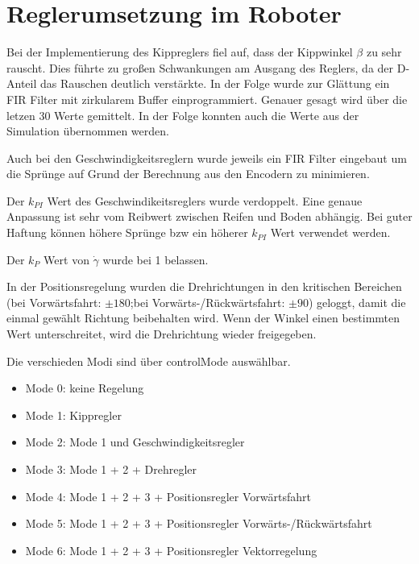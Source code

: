 \renewcommand{\autoren}{Timo Veit}
\newpage
\section{Reglerumsetzung im Roboter}
Bei der Implementierung des Kippreglers fiel auf, dass der Kippwinkel $\beta$ zu sehr rauscht. Dies führte zu großen Schwankungen am Ausgang des Reglers, da der D-Anteil das Rauschen deutlich verstärkte. In der Folge wurde zur Glättung ein FIR Filter mit zirkularem Buffer einprogrammiert. Genauer gesagt wird über die letzen 30 Werte gemittelt.
In der Folge konnten auch die Werte aus der Simulation übernommen werden.

Auch bei den Geschwindigkeitsreglern wurde jeweils ein FIR Filter eingebaut um die Sprünge auf Grund der Berechnung aus den Encodern zu minimieren.

Der $k_{PI}$ Wert des Geschwindikeitsreglers wurde verdoppelt. Eine genaue Anpassung ist sehr vom Reibwert zwischen Reifen und Boden abhängig. Bei guter Haftung können höhere Sprünge bzw ein höherer $k_{PI}$ Wert verwendet werden.

Der $k_{P}$ Wert von $\dot \gamma$ wurde bei 1 belassen.

In der Positionsregelung wurden die Drehrichtungen in den kritischen Bereichen (bei Vorwärtsfahrt: $\pm180$;bei Vorwärts-/Rückwärtsfahrt: $\pm90$) geloggt, damit die einmal gewählt Richtung beibehalten wird. Wenn der Winkel einen bestimmten Wert unterschreitet, wird die Drehrichtung wieder freigegeben.

Die verschieden Modi sind über controlMode auswählbar.

\begin{itemize}
	\item Mode 0: keine Regelung
	\item Mode 1: Kippregler
	\item Mode 2: Mode 1 und Geschwindigkeitsregler
	\item Mode 3: Mode 1 + 2 + Drehregler
	\item Mode 4: Mode 1 + 2 + 3 + Positionsregler Vorwärtsfahrt
	\item Mode 5: Mode 1 + 2 + 3 + Positionsregler Vorwärts-/Rückwärtsfahrt
	\item Mode 6: Mode 1 + 2 + 3 + Positionsregler Vektorregelung
\end{itemize}

\newpage

